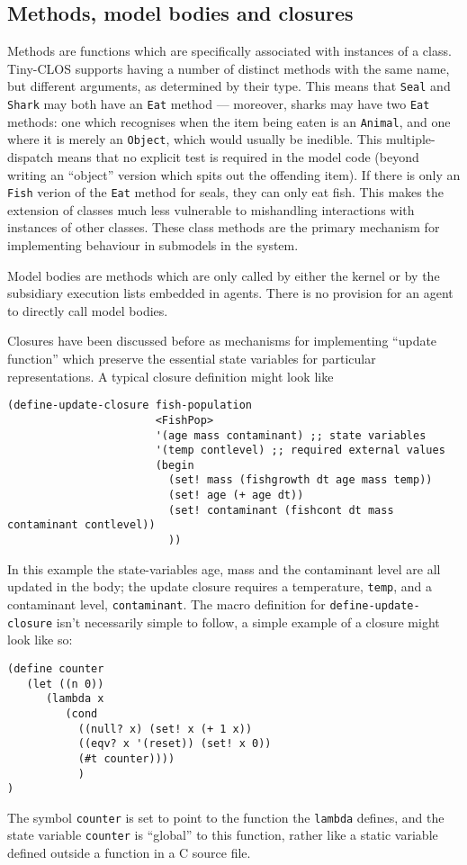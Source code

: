 \subsection{Methods, model bodies and closures}

Methods are functions which are specifically associated with instances
of a class.  Tiny-CLOS supports having a number of distinct methods
with the same name, but different arguments, as determined by their
type.  This means that \texttt{Seal} and \texttt{Shark} may both have an
\texttt{Eat} method --- moreover, sharks may have two \texttt{Eat}
methods: one which recognises when the item being eaten is an
\texttt{Animal}, and one where it is merely an \texttt{Object}, which
would usually be inedible.  This multiple-dispatch means that no
explicit test is required in the model code (beyond writing an
``object'' version which spits out the offending item).  If there is
only an \texttt{Fish} verion of the \texttt{Eat} method for seals,
they can only eat fish.  This makes the extension of classes much less
vulnerable to mishandling interactions with instances of other
classes.  These class methods are the primary mechanism for
implementing behaviour in submodels in the system.

Model bodies are methods which are only called by either the kernel
or by the subsidiary execution lists embedded in agents. There is no
provision for an agent to directly call model bodies.

Closures have been discussed before as mechanisms for implementing
``update function'' which preserve the essential state variables for
particular representations.  A typical closure definition might look like 
\begin{verbatim}
(define-update-closure fish-population
                       <FishPop>
                       '(age mass contaminant) ;; state variables 
                       '(temp contlevel) ;; required external values
                       (begin
                         (set! mass (fishgrowth dt age mass temp))
                         (set! age (+ age dt))
                         (set! contaminant (fishcont dt mass contaminant contlevel))
                         ))
\end{verbatim}
In this example the state-variables age, mass and the contaminant
level are all updated in the body; the update closure requires a
temperature, \texttt{temp}, and a contaminant level, \texttt{contaminant}.
The macro definition for \texttt{define-update-closure} isn't
necessarily simple to follow, a simple example of a closure might look
like so:
\begin{verbatim}
(define counter 
   (let ((n 0))
      (lambda x 
         (cond
           ((null? x) (set! x (+ 1 x))
           ((eqv? x '(reset)) (set! x 0))
           (#t counter))))
           )
)
\end{verbatim}
The symbol \texttt{counter} is set to point to the function the
\texttt{lambda} defines, and the state variable \texttt{counter} is
``global'' to this function, rather like a static variable defined
outside a function in a C source file. 
             


